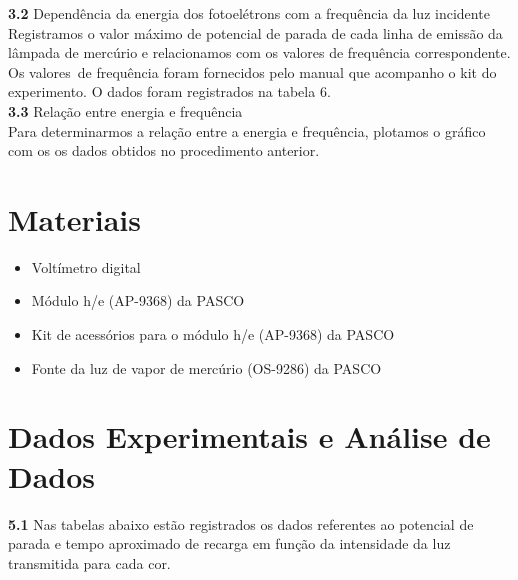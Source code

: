 \documentclass[12pt, a4paper]{article}
\begin{document}
 \quad \textbf{3.2} Dependência da energia dos fotoelétrons com a frequência da luz incidente\\
 
 \quad Registramos o valor máximo de potencial de parada de cada linha de emissão da lâmpada de mercúrio e relacionamos com os valores de frequência correspondente. Os valores\ de frequência foram fornecidos pelo manual que acompanho o kit do experimento. O dados foram registrados na tabela 6.\\
 
 \quad \textbf{3.3} Relação entre energia e frequência\\
 
\quad Para determinarmos a relação entre a energia e frequência, plotamos o gráfico com os os dados obtidos no procedimento anterior. 

\section{Materiais}
\begin{itemize}
    \item Voltímetro digital
    \item Módulo h/e (AP-9368) da PASCO
    \item Kit de acessórios para o módulo h/e (AP-9368) da PASCO
    \item Fonte da luz de vapor de mercúrio (OS-9286) da PASCO
\end{itemize}

\section{Dados Experimentais e Análise de Dados}
\quad \textbf{5.1}  Nas tabelas abaixo estão registrados os dados referentes ao potencial de parada e tempo aproximado de recarga em função da intensidade da luz transmitida para cada cor.\\
\end{document}
